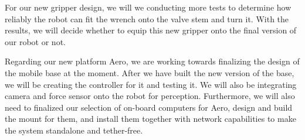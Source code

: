 \documentclass{standalone}
\begin{document}
For our new gripper design, we will we conducting more tests to determine how reliably the robot can fit the wrench onto the valve stem and turn it. With the results, we will decide whether to equip this new gripper onto the final version of our robot or not.

Regarding our new platform Aero, we are working towards finalizing the design of the mobile base at the moment. After we have built the new version of the base, we will be creating the controller for it and testing it. We will also be integrating camera and force sensor onto the robot for perception. Furthermore, we will also need to finalized our selection of on-board computers for Aero, design and build the mount for them, and install them together with network capabilities to make the system standalone and tether-free.
\end{document}
